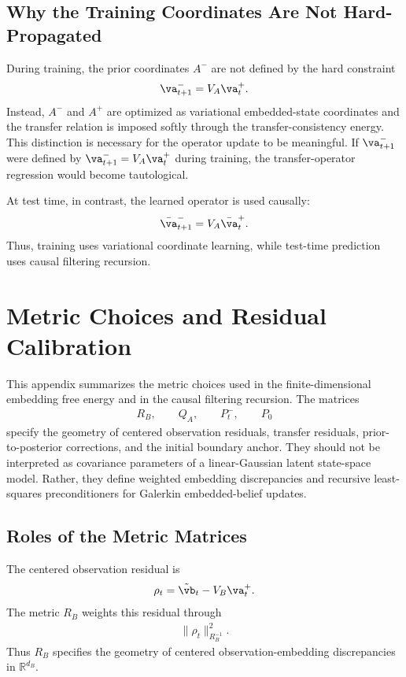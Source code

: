 \documentclass[twoside,11pt]{article}
\begin{document}
\subsection{Why the Training Coordinates Are Not Hard-Propagated}

During training, the prior coordinates $A^-$ are not defined by the hard
constraint
\begin{align}
\va_{t+1}^-
=
V_A\va_t^+.
\end{align}
Instead, $A^-$ and $A^+$ are optimized as variational embedded-state
coordinates and the transfer relation is imposed softly through the
transfer-consistency energy. This distinction is necessary for the
operator update to be meaningful. If $\va_{t+1}^-$ were defined by
$\va_{t+1}^-=V_A\va_t^+$ during training, the transfer-operator
regression would become tautological.

At test time, in contrast, the learned operator is used causally:
\begin{align}
\bar{\va}_{t+1}^-
=
V_A\bar{\va}_t^+.
\end{align}
Thus, training uses variational coordinate learning, while test-time
prediction uses causal filtering recursion.

\section{Metric Choices and Residual Calibration}
\label{app:metric_choices}

This appendix summarizes the metric choices used in the
finite-dimensional embedding free energy and in the causal filtering
recursion. The matrices
\begin{align}
R_B,\qquad Q_A,\qquad P_t^-,
\qquad P_0
\end{align}
specify the geometry of centered observation residuals, transfer
residuals, prior-to-posterior corrections, and the initial boundary
anchor. They should not be interpreted as covariance parameters of a
linear-Gaussian latent state-space model. Rather, they define weighted
embedding discrepancies and recursive least-squares preconditioners for
Galerkin embedded-belief updates.

\subsection{Roles of the Metric Matrices}

The centered observation residual is
\begin{align}
\rho_t
=
\tilde{\vb}_t - V_B\va_t^+.
\label{eq:app_obs_residual}
\end{align}
The metric $R_B$ weights this residual through
\begin{align}
\|\rho_t\|_{R_B^{-1}}^2.
\end{align}
Thus $R_B$ specifies the geometry of centered observation-embedding
discrepancies in $\mathbb R^{d_B}$.
\end{document}
